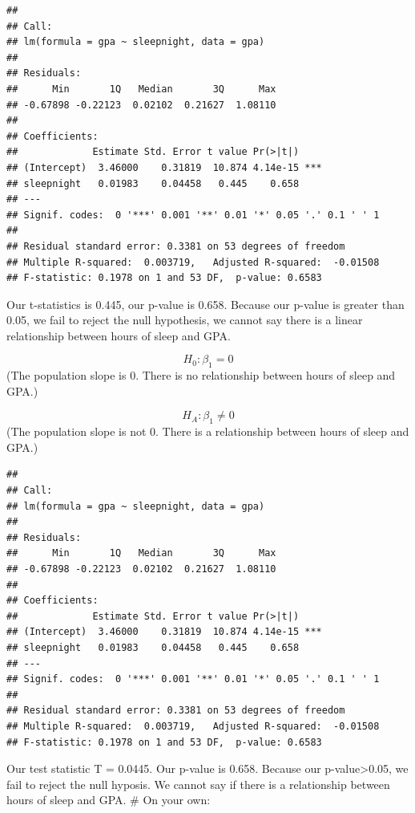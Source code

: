 \documentclass[]{article}
\newenvironment{Shaded}{\begin{snugshade}}{\end{snugshade}}
\newcommand{\KeywordTok}[1]{\textcolor[rgb]{0.13,0.29,0.53}{\textbf{#1}}}
\newcommand{\NormalTok}[1]{#1}
\newcommand{\OperatorTok}[1]{\textcolor[rgb]{0.81,0.36,0.00}{\textbf{#1}}}
\newcommand{\StringTok}[1]{\textcolor[rgb]{0.31,0.60,0.02}{#1}}
\begin{document}
\begin{verbatim}
## 
## Call:
## lm(formula = gpa ~ sleepnight, data = gpa)
## 
## Residuals:
##      Min       1Q   Median       3Q      Max 
## -0.67898 -0.22123  0.02102  0.21627  1.08110 
## 
## Coefficients:
##             Estimate Std. Error t value Pr(>|t|)    
## (Intercept)  3.46000    0.31819  10.874 4.14e-15 ***
## sleepnight   0.01983    0.04458   0.445    0.658    
## ---
## Signif. codes:  0 '***' 0.001 '**' 0.01 '*' 0.05 '.' 0.1 ' ' 1
## 
## Residual standard error: 0.3381 on 53 degrees of freedom
## Multiple R-squared:  0.003719,   Adjusted R-squared:  -0.01508 
## F-statistic: 0.1978 on 1 and 53 DF,  p-value: 0.6583
\end{verbatim}

Our t-statistics is 0.445, our p-value is 0.658. Because our p-value is
greater than 0.05, we fail to reject the null hypothesis, we cannot say
there is a linear relationship between hours of sleep and GPA.

\[H_0: \beta_1 = 0 \] (The population slope is 0. There is no
relationship between hours of sleep and GPA.)

\[H_A: \beta_1 \ne 0\] (The population slope is not 0. There is a
relationship between hours of sleep and GPA.)

\begin{Shaded}
\end{Shaded}

\begin{verbatim}
## 
## Call:
## lm(formula = gpa ~ sleepnight, data = gpa)
## 
## Residuals:
##      Min       1Q   Median       3Q      Max 
## -0.67898 -0.22123  0.02102  0.21627  1.08110 
## 
## Coefficients:
##             Estimate Std. Error t value Pr(>|t|)    
## (Intercept)  3.46000    0.31819  10.874 4.14e-15 ***
## sleepnight   0.01983    0.04458   0.445    0.658    
## ---
## Signif. codes:  0 '***' 0.001 '**' 0.01 '*' 0.05 '.' 0.1 ' ' 1
## 
## Residual standard error: 0.3381 on 53 degrees of freedom
## Multiple R-squared:  0.003719,   Adjusted R-squared:  -0.01508 
## F-statistic: 0.1978 on 1 and 53 DF,  p-value: 0.6583
\end{verbatim}

Our test statistic T = 0.0445. Our p-value is 0.658. Because our
p-value\textgreater{}0.05, we fail to reject the null hyposis. We cannot
say if there is a relationship between hours of sleep and GPA. \newpage
\# On your own:
\end{document}
